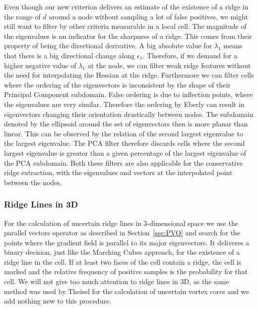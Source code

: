 Even though our new criterion delivers an estimate of the existence of a
ridge in the range of $d$ around a node without sampling a lot of false
positives, we might still want to filter by other criteria measurable in
a local cell. The magnitude of the eigenvalues is an indicator for the
sharpness of a ridge. This comes from their property of being the
directional derivative. A big absolute value for $\lambda_1$ means that
there is a big directional change along $\epsilon_1$. Therefore, if we
demand for a higher negative value of $\lambda_1$ at the node, we can
filter weak ridge features without the need for interpolating the
Hessian at the ridge. Furthermore we can filter cells where the
ordering of the eigenvectors is inconsistent by the shape of their
Principal Component subdomain. False ordering is due to inflection
points, where the eigenvalues are very similar. Therefore the ordering
by Eberly can result in eigenvectors changing their orientation
drastically between nodes. The subdomain denoted by the ellipsoid
around the set of eigenvectors then is more planar than linear. This
can be observed by the relation of the second largest eigenvalue to the
largest eigenvalue. The PCA filter therefore discards cells where the
second largest eigenvalue is greater than a given percentage of the
largest eigenvalue of the PCA subdomain. Both these filters are also
applicable for the conservative ridge extraction, with the eigenvalues
and vectors at the interpolated point between the nodes.

\subsubsection{Ridge Lines in 3D}

For the calculation of uncertain ridge lines in 3-dimensional space we
use the parallel vectors operator as described in Section~\ref{sec:PVO}
and search for the points where the gradient field is parallel to its
major eigenvectors. It deliveres a binary decision, just like the
Marching Cubes approach, for the existence of a ridge line in the cell.
If at least two faces of the cell contain a ridge, the cell is marked
and the relative frequency of positive samples is the probability for
that cell. We will not give too much attention to ridge lines in 3D, as
the same method was used by Theisel \etal{} for the calculation of
uncertain vortex cores and we add nothing new to this procedure.